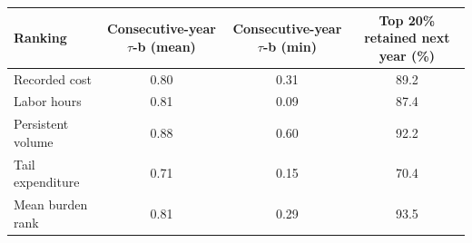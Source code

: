 \begin{tabular}{p{4.0cm}ccc}
\toprule
Ranking & Consecutive-year $\tau$-b (mean) & Consecutive-year $\tau$-b (min) & Top 20\% retained next year (\%) \\
\midrule
Recorded cost & 0.80 & 0.31 & 89.2 \\
Labor hours & 0.81 & 0.09 & 87.4 \\
Persistent volume & 0.88 & 0.60 & 92.2 \\
Tail expenditure & 0.71 & 0.15 & 70.4 \\
Mean burden rank & 0.81 & 0.29 & 93.5 \\
\bottomrule
\end{tabular}
